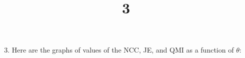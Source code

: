 \documentclass[a4paper]{article}
\title{3}
\date{}
\begin{document}
\maketitle

\begin{enumerate}[label=(\alph*)]
\setcounter{enumi}{2}
\item Here are the graphs of values of the NCC, JE, and QMI as a function of $\theta$:
\end{enumerate}
\end{document}
